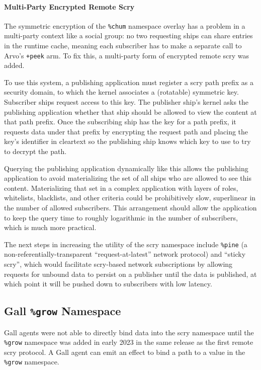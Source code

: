 \documentclass[twoside]{article}
\begin{document}
\paragraph{Multi-Party Encrypted Remote Scry}

The symmetric encryption of the \lstinline[style=inlinecode]{%chum} namespace overlay has a problem in a multi-party context like a social group: no two requesting ships can share entries in the runtime cache, meaning each subscriber has to make a separate call to Arvo's \lstinline[style=inlinecode]{+peek} arm.  To fix this, a multi-party form of encrypted remote scry was added.

To use this system, a publishing application must register a scry path prefix as a security domain, to which the kernel associates a (rotatable) symmetric key.  Subscriber ships request access to this key.  The publisher ship's kernel asks the publishing application whether that ship should be allowed to view the content at that path prefix.  Once the subscribing ship has the key for a path prefix, it requests data under that prefix by encrypting the request path and placing the key's identifier in cleartext so the publishing ship knows which key to use to try to decrypt the path.

Querying the publishing application dynamically like this allows the publishing application to avoid materializing the set of all ships who are allowed to see this content.  Materializing that set in a complex application with layers of roles, whitelists, blacklists, and other criteria could be prohibitively slow, superlinear in the number of allowed subscribers.  This arrangement should allow the application to keep the query time to roughly logarithmic in the number of subscribers, which is much more practical.

The next steps in increasing the utility of the scry namespace include \lstinline[style=inlinecode]{%pine} (a non-referentially-transparent ``request-at-latest'' network protocol) and ``sticky scry'', which would facilitate scry-based network subscriptions by allowing requests for unbound data to persist on a publisher until the data is published, at which point it will be pushed down to subscribers with low latency.

\subsection{Gall \texttt{\%grow} Namespace}

Gall agents were not able to directly bind data into the scry namespace until the \lstinline[style=inlinecode]{%grow} namespace was added in early 2023 in the same release as the first remote scry protocol.  A Gall agent can emit an effect to bind a path  to a value in the \lstinline[style=inlinecode]{%grow} namespace.  
\end{document}
